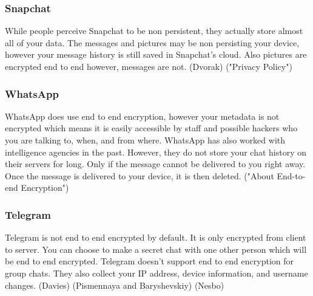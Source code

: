 \documentclass[11pt]{article}
\theoremstyle{plain}
\theoremstyle{definition}
\begin{document}
\subsubsection{Snapchat}
While people perceive Snapchat to be non persistent, they actually store almost all of your data. The messages and pictures may be non persisting your device, however your message history is still saved in Snapchat's cloud. Also pictures are encrypted end to end however, messages are not.
(Dvorak) ("Privacy Policy")
\subsubsection{WhatsApp}
WhatsApp does use end to end encryption, however your metadata is not encrypted which means it is easily accessible by staff and possible hackers who you are talking to, when, and from where. WhatsApp has also worked with intelligence agencies in the past. However, they do not store your chat history on their servers for long. Only if the message cannot be delivered to you right away. Once the message is delivered to your device, it is then deleted. ("About End-to-end Encryption")
\subsubsection{Telegram}
Telegram is not end to end encrypted by default. It is only encrypted from client to server. You can choose to make a secret chat with one other person which will be end to end encrypted. Telegram doesn't support end to end encryption for group chats. They also collect your IP address, device information, and username changes. (Davies) (Pismennaya and Baryshevskiy) (Nesbo)
\newline \newline




\setlength{\tabcolsep}{4pt} %
\end{document}
